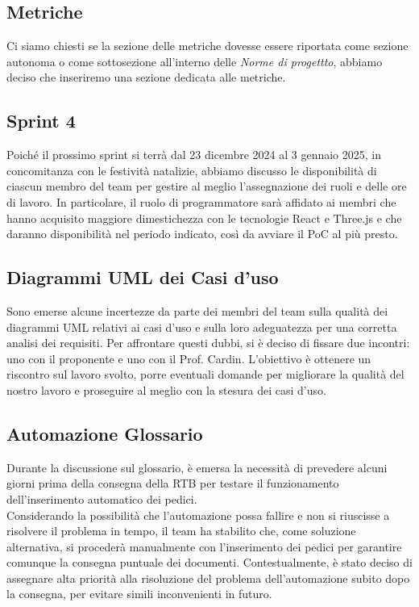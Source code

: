 \subsection{Metriche}
Ci siamo chiesti se la sezione delle metriche dovesse essere riportata come sezione autonoma o come sottosezione all'interno delle \textit{Norme di progettto}, abbiamo deciso che inseriremo una sezione dedicata alle metriche.

\subsection{Sprint 4}
Poiché il prossimo sprint si terrà dal 23 dicembre 2024 al 3 gennaio 2025, in concomitanza con le festività natalizie, abbiamo discusso le disponibilità di ciascun membro del team per gestire al meglio l'assegnazione dei ruoli e delle ore di lavoro. In particolare, il ruolo di programmatore sarà affidato ai membri che hanno acquisito maggiore dimestichezza con le tecnologie React e Three.js e che daranno disponibilità nel periodo indicato, così da avviare il PoC al più presto.

\subsection{Diagrammi UML dei Casi d'uso}
Sono emerse alcune incertezze da parte dei membri del team sulla qualità dei diagrammi UML relativi ai casi d'uso e sulla loro adeguatezza per una corretta analisi dei requisiti. Per affrontare questi dubbi, si è deciso di fissare due incontri: uno con il proponente e uno con il Prof. Cardin. L'obiettivo è ottenere un riscontro sul lavoro svolto, porre eventuali domande per migliorare la qualità del nostro lavoro e proseguire al meglio con la stesura dei casi d'uso.  

\subsection{Automazione Glossario}
Durante la discussione sul glossario, è emersa la necessità di prevedere alcuni giorni prima della consegna della RTB per testare il funzionamento dell'inserimento automatico dei pedici. 
\\Considerando la possibilità che l'automazione possa fallire e non si riuscisse a risolvere il problema in tempo, il team ha stabilito che, come soluzione alternativa, si procederà manualmente con l'inserimento dei pedici per garantire comunque la consegna puntuale dei documenti. 
Contestualmente, è stato deciso di assegnare alta priorità alla risoluzione del problema dell'automazione subito dopo la consegna, per evitare simili inconvenienti in futuro.

